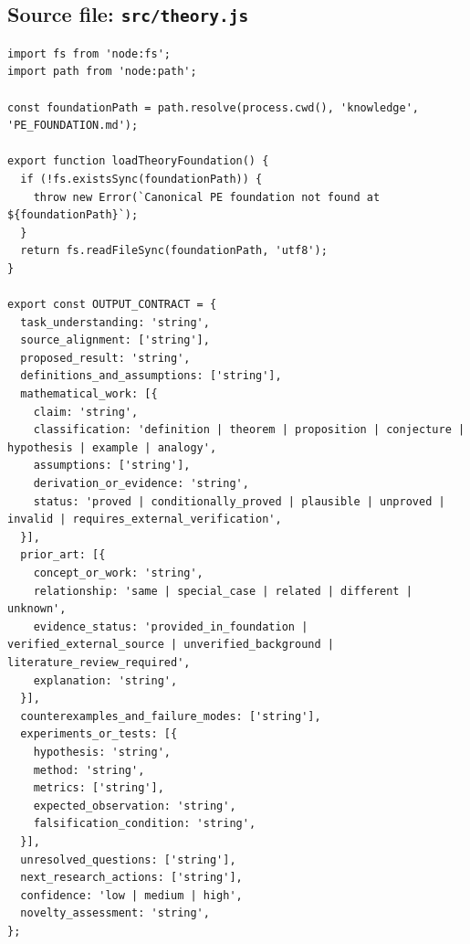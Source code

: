 \documentclass[10pt,a4paper]{article}
\begin{document}
\subsection{Source file: \texttt{src/theory.js}}
\begin{lstlisting}
import fs from 'node:fs';
import path from 'node:path';

const foundationPath = path.resolve(process.cwd(), 'knowledge', 'PE_FOUNDATION.md');

export function loadTheoryFoundation() {
  if (!fs.existsSync(foundationPath)) {
    throw new Error(`Canonical PE foundation not found at ${foundationPath}`);
  }
  return fs.readFileSync(foundationPath, 'utf8');
}

export const OUTPUT_CONTRACT = {
  task_understanding: 'string',
  source_alignment: ['string'],
  proposed_result: 'string',
  definitions_and_assumptions: ['string'],
  mathematical_work: [{
    claim: 'string',
    classification: 'definition | theorem | proposition | conjecture | hypothesis | example | analogy',
    assumptions: ['string'],
    derivation_or_evidence: 'string',
    status: 'proved | conditionally_proved | plausible | unproved | invalid | requires_external_verification',
  }],
  prior_art: [{
    concept_or_work: 'string',
    relationship: 'same | special_case | related | different | unknown',
    evidence_status: 'provided_in_foundation | verified_external_source | unverified_background | literature_review_required',
    explanation: 'string',
  }],
  counterexamples_and_failure_modes: ['string'],
  experiments_or_tests: [{
    hypothesis: 'string',
    method: 'string',
    metrics: ['string'],
    expected_observation: 'string',
    falsification_condition: 'string',
  }],
  unresolved_questions: ['string'],
  next_research_actions: ['string'],
  confidence: 'low | medium | high',
  novelty_assessment: 'string',
};
\end{lstlisting}
\end{document}
